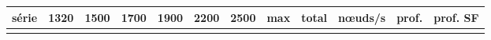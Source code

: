 \begin{tabular}{lcccccccrrrr}
\toprule
série & 1320 & 1500 & 1700 & 1900 & 2200 & 2500 & max & total & nœuds/s & prof. & prof. SF\\
\midrule
\\
\bottomrule
\end{tabular}
